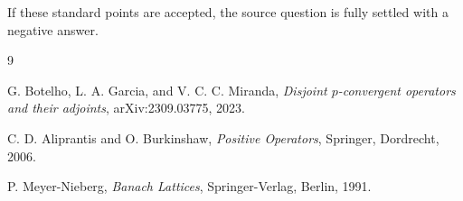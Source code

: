 \documentclass[11pt]{article}
\begin{document}
If these standard points are accepted, the source question is fully settled
with a negative answer.

\begin{thebibliography}{9}

G. Botelho, L. A. Garcia, and V. C. C. Miranda,
\emph{Disjoint \(p\)-convergent operators and their adjoints},
arXiv:2309.03775, 2023.

C. D. Aliprantis and O. Burkinshaw,
\emph{Positive Operators},
Springer, Dordrecht, 2006.

P. Meyer-Nieberg,
\emph{Banach Lattices},
Springer-Verlag, Berlin, 1991.

\end{thebibliography}
\end{document}
